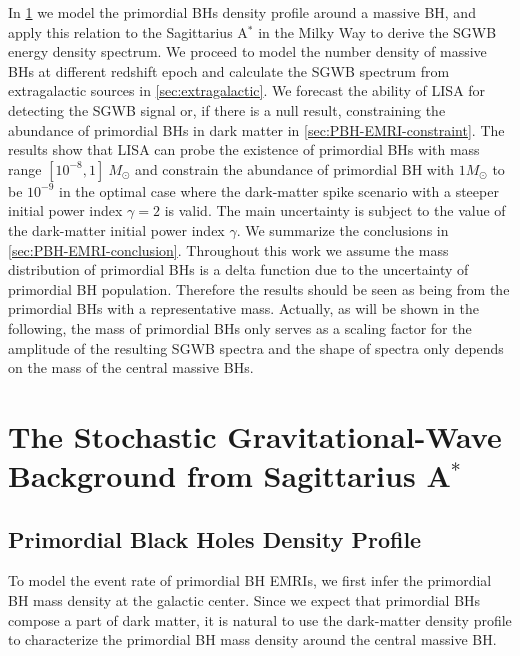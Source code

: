 In \cref{sec:sgrA} we model the primordial \acp{BH} density profile around a massive \ac{BH}, and apply this relation to the Sagittarius A$^\ast$ in the Milky Way to derive the \ac{SGWB} energy density spectrum.
We proceed to model the number density of massive \acp{BH} at different redshift epoch and calculate the \ac{SGWB} spectrum from extragalactic sources in \cref{sec:extragalactic}.
We forecast the ability of \ac{LISA} for detecting the \ac{SGWB} signal or, if there is a null result, constraining the abundance of primordial \acp{BH} in dark matter in \cref{sec:PBH-EMRI-constraint}.
The results show that \ac{LISA} can probe the existence of primordial \acp{BH} with mass range $[10^{-8} , 1 ]~M_\odot$ and constrain the abundance of primordial \ac{BH} with $1 M_\odot$ to be $10^{-9}$ in the optimal case where the dark-matter spike scenario with a steeper initial power index $\gamma=2$ is valid.
The main uncertainty is subject to the value of the dark-matter initial power index $\gamma$.
We summarize the conclusions in \cref{sec:PBH-EMRI-conclusion}.
Throughout this work we assume the mass distribution of primordial \acp{BH} is a delta function due to the uncertainty of primordial \ac{BH} population.
Therefore the results should be seen as being from the primordial \acp{BH} with a representative mass.
Actually, as will be shown in the following, the mass of primordial \acp{BH} only serves as a scaling factor for the amplitude of the resulting \ac{SGWB} spectra and the shape of spectra only depends on the mass of the central massive \acp{BH}.

\section{The Stochastic Gravitational-Wave Background from Sagittarius A$^\ast$}\label{sec:sgrA}
\subsection{Primordial Black Holes Density Profile} 
To model the event rate of primordial \ac{BH} \acp{EMRI}, we first infer the primordial \ac{BH} mass density at the galactic center. 
Since we expect that primordial \acp{BH} compose a part of dark matter, it is natural to use the dark-matter density profile to characterize the primordial \ac{BH} mass density around the central massive \ac{BH}.

